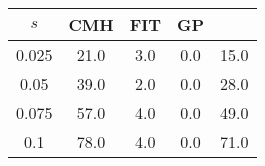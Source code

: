 \centering \begin{tabular}{c|c|c|c|c}
$s$	&CMH	&FIT	&GP	&\sc{Clear}\\\hline
0.025	&21.0	&3.0	&0.0	&15.0\\
0.05	&39.0	&2.0	&0.0	&28.0\\
0.075	&57.0	&4.0	&0.0	&49.0\\
0.1	&78.0	&4.0	&0.0	&71.0\\
\end{tabular}
